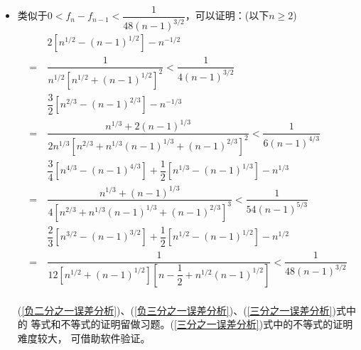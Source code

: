 \begin{itemize}[leftmargin=\inteval{\myitemleftmargin}pt,itemsep=
   \inteval{\myitemitempsep}pt,topsep=\inteval{\myitemtopsep}pt]
\item 类似于$ 0<f_n-f_{n-1}<\dfrac{1}{48(n-1)^{3/2}} $，可以证明：(以下$ n\geq 2 $)
\begin{align}
    &\ 2\left[n^{1/2}-(n-1)^{1/2}\right]-n^{-1/2}\nonumber\\ =&\
    \dfrac{1}{n^{1/2}\left[n^{1/2}+(n-1)^{1/2}\right]^2}
    <\dfrac{1}{4(n-1)^{3/2}} \label{负二分之一误差分析} \\
    &\ \dfrac{3}{2}\left[n^{2/3}-(n-1)^{2/3}\right]-n^{-1/3}\nonumber\\ =&\
    \dfrac{n^{1/3}+2(n-1)^{1/3}}{2n^{1/3}\left[n^{2/3}+n^{1/3}(n-1)^{1/3}+(n-1)
        ^{2/3}\right]^2} < \dfrac{1}{6(n-1)^{4/3}} \label{负三分之一误差分析}\\
    &\ \dfrac{3}{4}\left[n^{4/3}-(n-1)^{4/3}\right]+\dfrac{1}{2}\left[n^{1/3}
    -(n-1)^{1/3}\right]-n^{1/3} \nonumber \\ =&\ \dfrac{n^{1/3}+(n-1)^{1/3}}{4
        \left[n^{2/3}+n^{1/3}(n-1)^{1/3}+(n-1)^{2/3}\right]^3}<
    \dfrac{1}{54(n-1)^{5/3}}   \label{三分之一误差分析} \\
    &\ \dfrac{2}{3}\left[n^{3/2}-(n-1)^{3/2}\right]
    +\dfrac{1}{2}\left[n^{1/2}-(n-1)^{1/2}\right]-n^{1/2} \nonumber\\ =&\ 
    \dfrac{1}{12\left[n^{1/2}+(n-1)^{1/2}\right]\left[n-\dfrac{1}{2}+
        n^{1/2}(n-1)^{1/2}\right]}<\dfrac{1}{48(n-1)^{3/2}} \label{二分之一误差分析}
\end{align} \\
(\ref{负二分之一误差分析})、(\ref{负三分之一误差分析})、(\ref{三分之一误差分析})式中的
等式和不等式的证明留做习题。(\ref{三分之一误差分析})式中的不等式的证明难度较大，
可借助软件验证。


\end{itemize}
